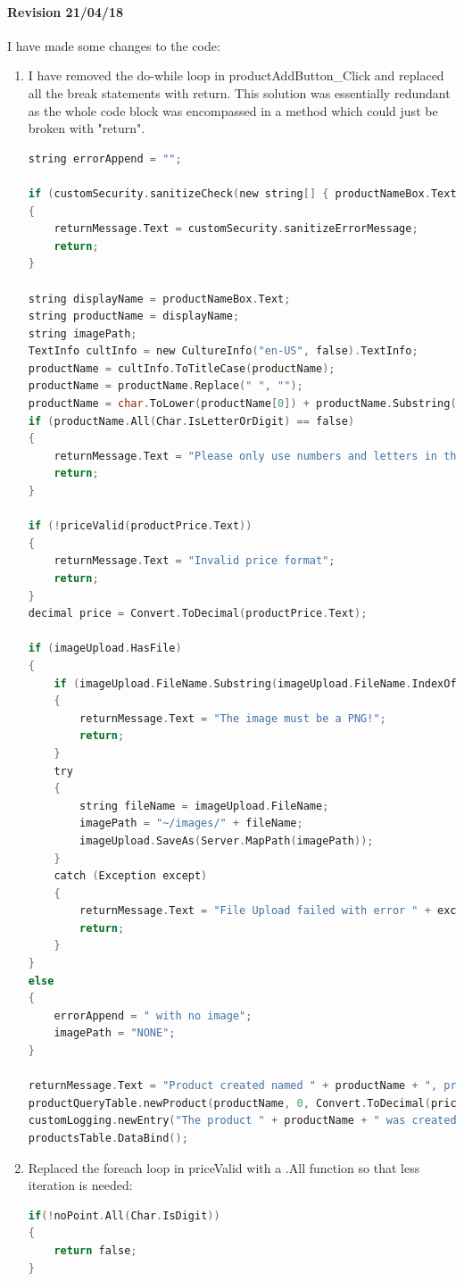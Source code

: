 ﻿\documentclass{article}
\begin{document}
    \paragraph{Revision 21/04/18}
    I have made some changes to the code:
    \begin{enumerate}
        \item I have removed the do-while loop in productAddButton\_Click and replaced all the break statements with return.
        This solution was essentially redundant as the whole code block was encompassed in a method which could just be broken with "return".
        \begin{lstlisting}[language=C]
string errorAppend = "";

if (customSecurity.sanitizeCheck(new string[] { productNameBox.Text, productPrice.Text, bandBox.Text, descriptionBox.Text }) != true)
{
    returnMessage.Text = customSecurity.sanitizeErrorMessage;
    return;
}

string displayName = productNameBox.Text;
string productName = displayName;
string imagePath;
TextInfo cultInfo = new CultureInfo("en-US", false).TextInfo;
productName = cultInfo.ToTitleCase(productName);
productName = productName.Replace(" ", "");
productName = char.ToLower(productName[0]) + productName.Substring(1);
if (productName.All(Char.IsLetterOrDigit) == false)
{
    returnMessage.Text = "Please only use numbers and letters in the product name!";
    return;
}

if (!priceValid(productPrice.Text))
{
    returnMessage.Text = "Invalid price format";
    return;
}
decimal price = Convert.ToDecimal(productPrice.Text);

if (imageUpload.HasFile)
{
    if (imageUpload.FileName.Substring(imageUpload.FileName.IndexOf(".")) != "png")
    {
        returnMessage.Text = "The image must be a PNG!";
        return;
    }
    try
    {
        string fileName = imageUpload.FileName;
        imagePath = "~/images/" + fileName;
        imageUpload.SaveAs(Server.MapPath(imagePath)); 
    }
    catch (Exception except)
    {
        returnMessage.Text = "File Upload failed with error " + except.Message + ", please contact a developer";
        return;
    }
}
else
{
    errorAppend = " with no image";
    imagePath = "NONE";
}

returnMessage.Text = "Product created named " + productName + ", priced at £" + common.formatPrice(price) + " and displayed as " + displayName + errorAppend;
productQueryTable.newProduct(productName, 0, Convert.ToDecimal(price), displayName, typeDropdown.SelectedValue, Convert.ToString(Session["currentUser"]), imagePath, bandBox.Text, descriptionBox.Text);
customLogging.newEntry("The product " + productName + " was created");
productsTable.DataBind();
        \end{lstlisting}
        \item Replaced the foreach loop in priceValid with a .All function so that less iteration is needed:
        \begin{lstlisting}[language=C]
if(!noPoint.All(Char.IsDigit))
{
    return false;
}
        \end{lstlisting}
    \end{enumerate}
    \newpage
\end{document}
